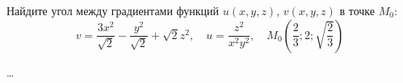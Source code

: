 \begin{problem}
Найдите угол между градиентами функций \( u(x,y,z) \), \( v(x,y,z) \) в точке \( M_0 \):
\[ v = \frac{3x^2}{\sqrt{2}} - \frac{y^2}{\sqrt{2}} + \sqrt{2}z^{2}, \quad u = \frac{z^2}{x^2y^2}, \quad M_0\left(\frac{2}{3};2;\sqrt{\frac{2}{3}}\right) \]
\end{problem}

\begin{solution}
  \dots
\end{solution}
